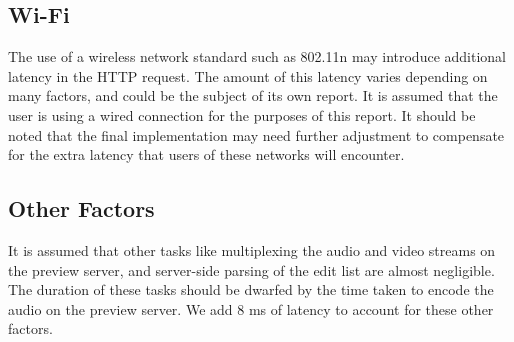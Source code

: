 \documentclass[se,resubmit]{uw-wkrpt}
\begin{document}
\begin{appendices}
\subsection{Wi-Fi}
The use of a wireless network standard such as 802.11n may introduce
additional latency in the HTTP request. The amount of this latency varies
depending on many factors, and could be the subject of its own report. It
is assumed that the user is using a wired connection for the purposes of
this report. It should be noted that the final implementation may need
further adjustment to compensate for the extra latency that users of these
networks will encounter.

\subsection{Other Factors}
It is assumed that other tasks like multiplexing the audio and video
streams on the preview server, and server-side parsing of the edit list
are almost negligible. The duration of these tasks should be dwarfed by
the time taken to encode the audio on the preview server. We add 8 ms of
latency to account for these other factors.

\end{appendices}
\end{document}
